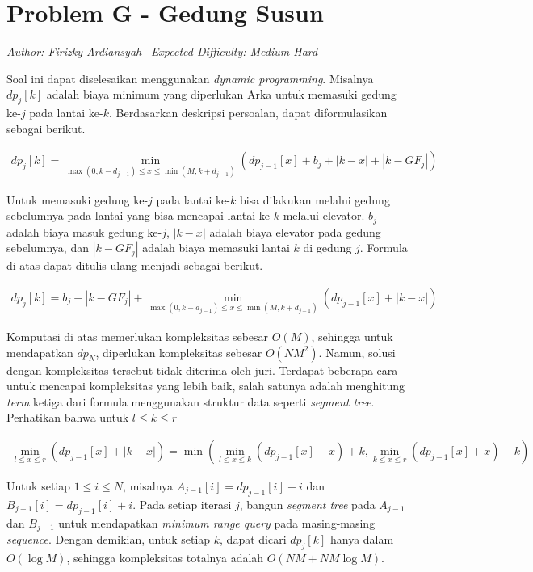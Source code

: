 \section*{Problem G - Gedung Susun}
\textit{Author: Firizky Ardiansyah}
\
\textit{Expected Difficulty: Medium-Hard}

Soal ini dapat diselesaikan menggunakan \textit{dynamic programming}. Misalnya $dp_j[k]$ adalah biaya minimum yang diperlukan Arka untuk memasuki gedung ke-$j$ pada lantai ke-$k$. Berdasarkan deskripsi persoalan, dapat diformulasikan sebagai berikut.


\begin{align*} 
    dp_j[k] = \min_{\max(0, k-d_{j-1}) \leq x \leq \min(M, k+d_{j-1})} (dp_{j-1}[x] + b_j + |k - x| + |k - GF_j|)
\end{align*}

Untuk memasuki gedung ke-$j$ pada lantai ke-$k$ bisa dilakukan melalui gedung sebelumnya pada lantai yang bisa mencapai lantai ke-$k$ melalui elevator. $b_{j}$ adalah biaya masuk gedung ke-$j$, $|k - x|$ adalah biaya elevator pada gedung sebelumnya, dan $|k - GF_j|$ adalah biaya memasuki lantai $k$ di gedung $j$. Formula di atas dapat ditulis ulang menjadi sebagai berikut.

\begin{align*} 
    dp_j[k] =  b_j  + |k - GF_j| + \min_{\max(0, k-d_{j-1}) \leq x \leq \min(M, k+d_{j-1})} (dp_{j-1}[x] + |k - x|)
\end{align*}

Komputasi di atas memerlukan kompleksitas sebesar $O(M)$, sehingga untuk mendapatkan $dp_N$, diperlukan kompleksitas sebesar $O(NM^2)$. Namun, solusi dengan kompleksitas tersebut tidak diterima oleh juri. Terdapat beberapa cara untuk mencapai kompleksitas yang lebih baik, salah satunya adalah menghitung \textit{term} ketiga dari formula menggunakan struktur data seperti \textit{segment tree}. Perhatikan bahwa untuk $l \leq k \leq r$

\begin{align*} 
    \min_{l \leq x \leq r} (dp_{j-1}[x] + |k - x|) = \min( \min_{l \leq x \leq k} (dp_{j-1}[x] - x) + k, \min_{k \leq x \leq r} (dp_{j-1}[x] + x) - k)
\end{align*}

Untuk setiap $1 \leq i \leq N$, misalnya $A_{j-1}[i] = dp_{j-1}[i] - i$ dan $B_{j-1}[i] = dp_{j-1}[i] + i$. Pada setiap iterasi $j$, bangun \textit{segment tree} pada $A_{j-1}$ dan $B_{j-1}$ untuk mendapatkan \textit{minimum range query} pada masing-masing \textit{sequence}. Dengan demikian, untuk setiap $k$, dapat dicari $dp_j[k]$ hanya dalam $O(\log M)$, sehingga kompleksitas totalnya adalah $O(NM + NM \log M)$. 

